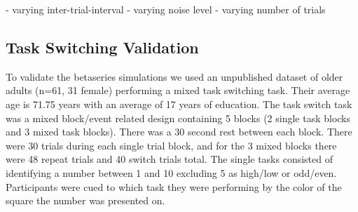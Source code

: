\documentclass[10pt,letterpaper]{article}
\begin{document}


- varying inter-trial-interval
- varying noise level
- varying number of trials

\subsection*{Task Switching Validation}
To validate the betaseries simulations we used an unpublished dataset
of older adults (n=61, 31 female) performing a mixed task switching task.
Their average age is 71.75 years with an average of 17 years of education.
The task switch task was a mixed block/event related design containing
5 blocks (2 single task blocks and 3 mixed task blocks).
There was a 30 second rest between each block.
There were 30 trials during each single trial block,
and for the 3 mixed blocks there were 48 repeat trials and 40 switch trials total.
The single tasks consisted of identifying a number between
1 and 10 excluding 5 as high/low or odd/even.
Participants were cued to which task they were performing by the color of the square
the number was presented on.
\end{document}

